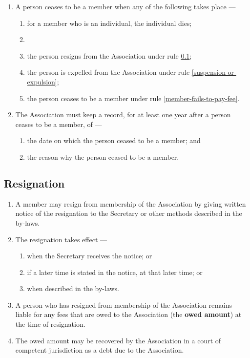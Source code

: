 \documentclass[../constitution.tex]{subfiles}
\begin{document}
\begin{enumerate}

\item A person ceases to be a member when any of the following takes place ---

  \begin{enumerate}
  
  \item for a member who is an individual, the individual dies;
  \item {}
  \item the person resigns from the Association under rule \ref{resignation};
  \item the person is expelled from the Association under rule \ref{suspension-or-expulsion};
  \item the person ceases to be a member under rule \ref{member-fails-to-pay-fee}.
  \end{enumerate}
\item The Association must keep a record, for at least one year after a person ceases to be a member, of ---

  \begin{enumerate}
  
  \item the date on which the person ceased to be a member; and
  \item the reason why the person ceased to be a member.
  \end{enumerate}
\end{enumerate}


\subsection{Resignation} \label{resignation}

\begin{enumerate}

\item A member may resign from membership of the Association by giving written notice of the resignation to the Secretary or other methods described in the by-laws.
\item The resignation takes effect ---
  \begin{enumerate}
  \item when the Secretary receives the notice; or
  \item if a later time is stated in the notice, at that later time; or
  \item when described in the by-laws.
  \end{enumerate}
\item A person who has resigned from membership of the Association remains liable for any fees that are owed to the Association (the \textbf{owed amount}) at the time of resignation.
\item The owed amount may be recovered by the Association in a court of competent jurisdiction as a debt due to the Association.
\end{enumerate}
\end{document}
